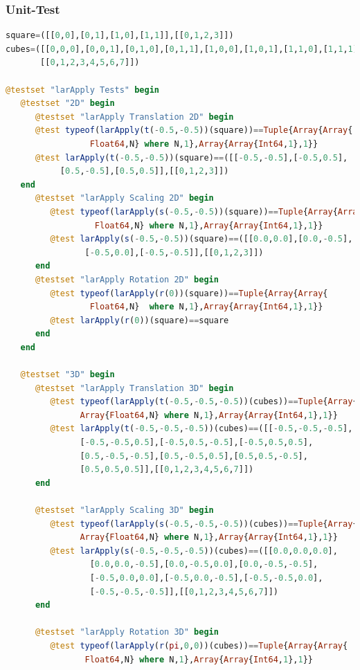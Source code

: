\documentclass[a4paper,12pt]{article}
\begin{document}
\subsubsection{Unit-Test}
\begin{lstlisting}[language=Julia]
square=([[0,0],[0,1],[1,0],[1,1]],[[0,1,2,3]])
cubes=([[0,0,0],[0,0,1],[0,1,0],[0,1,1],[1,0,0],[1,0,1],[1,1,0],[1,1,1]],
       [[0,1,2,3,4,5,6,7]])

@testset "larApply Tests" begin
   @testset "2D" begin
      @testset "larApply Translation 2D" begin
      @test typeof(larApply(t(-0.5,-0.5))(square))==Tuple{Array{Array{
                 Float64,N} where N,1},Array{Array{Int64,1},1}}
      @test larApply(t(-0.5,-0.5))(square)==([[-0.5,-0.5],[-0.5,0.5],
           [0.5,-0.5],[0.5,0.5]],[[0,1,2,3]])
   end
      @testset "larApply Scaling 2D" begin
         @test typeof(larApply(s(-0.5,-0.5))(square))==Tuple{Array{Array{
                  Float64,N} where N,1},Array{Array{Int64,1},1}}
         @test larApply(s(-0.5,-0.5))(square)==([[0.0,0.0],[0.0,-0.5],
                [-0.5,0.0],[-0.5,-0.5]],[[0,1,2,3]])
      end
      @testset "larApply Rotation 2D" begin
         @test typeof(larApply(r(0))(square))==Tuple{Array{Array{
                 Float64,N}  where N,1},Array{Array{Int64,1},1}}
         @test larApply(r(0))(square)==square
      end
   end

   @testset "3D" begin
      @testset "larApply Translation 3D" begin
         @test typeof(larApply(t(-0.5,-0.5,-0.5))(cubes))==Tuple{Array{
               Array{Float64,N} where N,1},Array{Array{Int64,1},1}}
         @test larApply(t(-0.5,-0.5,-0.5))(cubes)==([[-0.5,-0.5,-0.5],
               [-0.5,-0.5,0.5],[-0.5,0.5,-0.5],[-0.5,0.5,0.5],
               [0.5,-0.5,-0.5],[0.5,-0.5,0.5],[0.5,0.5,-0.5],
               [0.5,0.5,0.5]],[[0,1,2,3,4,5,6,7]])
      end 
	
      @testset "larApply Scaling 3D" begin
         @test typeof(larApply(s(-0.5,-0.5,-0.5))(cubes))==Tuple{Array{
               Array{Float64,N} where N,1},Array{Array{Int64,1},1}}
         @test larApply(s(-0.5,-0.5,-0.5))(cubes)==([[0.0,0.0,0.0],
                 [0.0,0.0,-0.5],[0.0,-0.5,0.0],[0.0,-0.5,-0.5],
                 [-0.5,0.0,0.0],[-0.5,0.0,-0.5],[-0.5,-0.5,0.0],
                 [-0.5,-0.5,-0.5]],[[0,1,2,3,4,5,6,7]])
      end
	
      @testset "larApply Rotation 3D" begin
         @test typeof(larApply(r(pi,0,0))(cubes))==Tuple{Array{Array{
                Float64,N} where N,1},Array{Array{Int64,1},1}}
\end{lstlisting}
\end{document}
